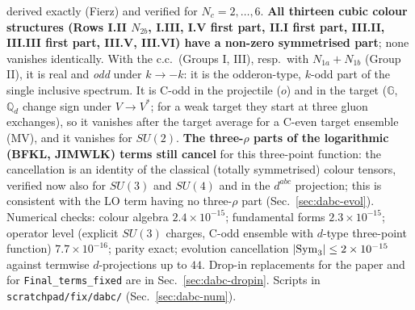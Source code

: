 \documentclass[10pt]{article}
\def\mf#1{\mathbb{#1}}
\begin{document}
derived exactly (Fierz) and verified for $N_{c}=2,\dots,6$. \textbf{All thirteen cubic colour structures (Rows I.II $N_{2b}$, I.III, I.V first part, II.I first part, III.II, III.III first part, III.V, III.VI) have a non-zero symmetrised part}; none vanishes identically. With the c.c.\ (Groups I, III), resp.\ with $N_{1a}+N_{1b}$ (Group II), it is real and \emph{odd} under $k\to-k$: it is the odderon-type, $k$-odd part of the single inclusive spectrum. It is C-odd in the projectile ($o$) and in the target ($\mf{G}$, $\mf{Q}_{d}$ change sign under $V\to V^{*}$; for a weak target they start at three gluon exchanges), so it vanishes after the target average for a C-even target ensemble (MV), and it vanishes for $SU(2)$. \textbf{The three-$\rho$ parts of the logarithmic (BFKL, JIMWLK) terms still cancel} for this three-point function: the cancellation is an identity of the classical (totally symmetrised) colour tensors, verified now also for $SU(3)$ and $SU(4)$ and in the $d^{abc}$ projection; this is consistent with the LO term having no three-$\rho$ part (Sec.~\ref{sec:dabc-evol}). Numerical checks: colour algebra $2.4\times10^{-15}$; fundamental forms $2.3\times10^{-15}$; operator level (explicit $SU(3)$ charges, C-odd ensemble with $d$-type three-point function) $7.7\times10^{-16}$; parity exact; evolution cancellation $|{\rm Sym}_{3}|\le2\times10^{-15}$ against termwise $d$-projections up to $44$. Drop-in replacements for the paper and for \texttt{Final\_terms\_fixed} are in Sec.~\ref{sec:dabc-dropin}. Scripts in \texttt{scratchpad/fix/dabc/} (Sec.~\ref{sec:dabc-num}).
\end{document}
